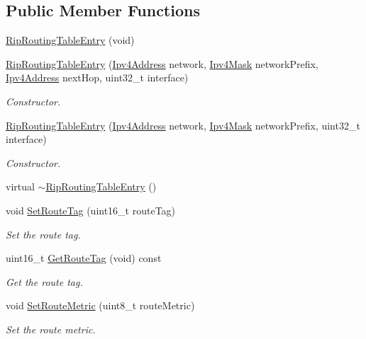 \subsection*{Public Member Functions}
\begin{DoxyCompactItemize}
\item 
\hyperlink{classns3_1_1RipRoutingTableEntry_ad409ae8c03934c1c146640adaee20193}{Rip\+Routing\+Table\+Entry} (void)
\item 
\hyperlink{classns3_1_1RipRoutingTableEntry_ae98bc465342f46d1f70835af725cd70c}{Rip\+Routing\+Table\+Entry} (\hyperlink{classns3_1_1Ipv4Address}{Ipv4\+Address} network, \hyperlink{classns3_1_1Ipv4Mask}{Ipv4\+Mask} network\+Prefix, \hyperlink{classns3_1_1Ipv4Address}{Ipv4\+Address} next\+Hop, uint32\+\_\+t interface)
\begin{DoxyCompactList}\small\item\em Constructor. \end{DoxyCompactList}\item 
\hyperlink{classns3_1_1RipRoutingTableEntry_aedb32b2021a86dc16e6f964f763da2f2}{Rip\+Routing\+Table\+Entry} (\hyperlink{classns3_1_1Ipv4Address}{Ipv4\+Address} network, \hyperlink{classns3_1_1Ipv4Mask}{Ipv4\+Mask} network\+Prefix, uint32\+\_\+t interface)
\begin{DoxyCompactList}\small\item\em Constructor. \end{DoxyCompactList}\item 
virtual \hyperlink{classns3_1_1RipRoutingTableEntry_af1c453d67e8f555fa33927aaf3a3310b}{$\sim$\+Rip\+Routing\+Table\+Entry} ()
\item 
void \hyperlink{classns3_1_1RipRoutingTableEntry_a88b521fcfdef30fb7cf4ea977d03a0d7}{Set\+Route\+Tag} (uint16\+\_\+t route\+Tag)
\begin{DoxyCompactList}\small\item\em Set the route tag. \end{DoxyCompactList}\item 
uint16\+\_\+t \hyperlink{classns3_1_1RipRoutingTableEntry_ade78dbaf780077451b3246f4d1e38fca}{Get\+Route\+Tag} (void) const 
\begin{DoxyCompactList}\small\item\em Get the route tag. \end{DoxyCompactList}\item 
void \hyperlink{classns3_1_1RipRoutingTableEntry_a0142d500046ef047a80ec00edbfac762}{Set\+Route\+Metric} (uint8\+\_\+t route\+Metric)
\begin{DoxyCompactList}\small\item\em Set the route metric. \end{DoxyCompactList}\item 

\end{DoxyCompactItemize}
